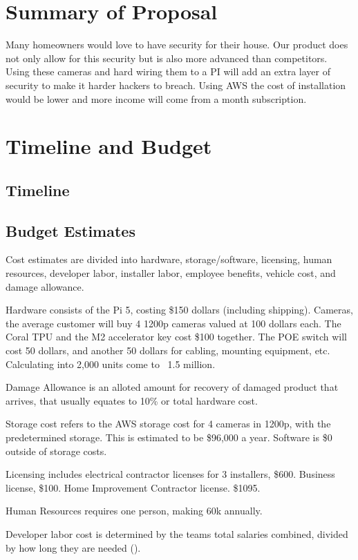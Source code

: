 \documentclass{report}
\begin{document}
\chapter{Summary of Proposal}
Many homeowners would love to have security for their house.
Our product does not only allow for this security but is also more advanced than competitors.
Using these cameras and hard wiring them to a PI will add an extra layer of security to make it harder hackers to breach.
Using AWS the cost of installation would be lower and more income will come from a month subscription.




\chapter{Timeline and Budget}
\section{Timeline}

\section{Budget Estimates}
Cost estimates are divided into hardware, 
storage/software, licensing, human resources,
developer labor, installer labor, employee benefits, 
vehicle cost, and damage allowance.

Hardware consists of the Pi 5, costing \$150 dollars (including shipping). Cameras, 
the average customer will buy 4 1200p cameras valued at 100 dollars each. 
The Coral TPU and the M2 accelerator key cost \$100 together.
The POE switch will cost 50 dollars, and another 50 dollars for cabling, mounting equipment, etc. Calculating into 2,000 units come to ~1.5 million.

Damage Allowance is an alloted amount for recovery of damaged product that arrives, that usually equates to 10\% or total hardware cost.

Storage cost refers to the AWS storage cost for 4 cameras in 1200p, with the predetermined storage. This is estimated to be \$96,000 a year.
Software is \$0 outside of storage costs.

Licensing includes electrical contractor licenses for 3 installers, \$600. Business license, \$100. 
Home Improvement Contractor license. \$1095.

Human Resources requires one person, making 60k annually. 

Developer labor cost is determined by the teams total salaries combined, divided by how long they are needed ().
\end{document}
